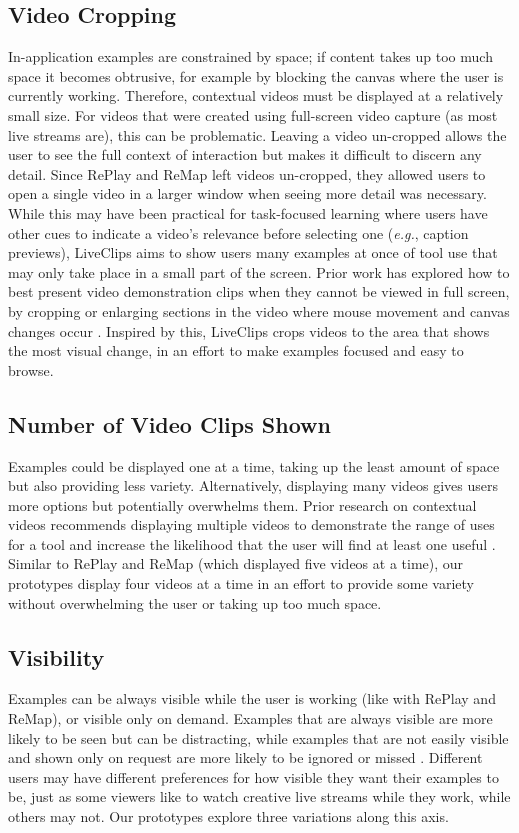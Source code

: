 \subsection{Video Cropping}
In-application examples are constrained by space; if content takes up too much space it becomes obtrusive, for example by blocking the canvas where the user is currently working. Therefore, contextual videos must be displayed at a relatively small size. For videos that were created using full-screen video capture (as most live streams are), this can be problematic. Leaving a video un-cropped allows the user to see the full context of interaction but makes it difficult to discern any detail. Since RePlay and ReMap left videos un-cropped, they allowed users to open a single video in a larger window when seeing more detail was necessary. While this may have been practical for task-focused learning where users have other cues to indicate a video's relevance before selecting one (\textit{e.g.}, caption previews), LiveClips aims to show users many examples at once of tool use that may only take place in a small part of the screen. Prior work has explored how to best present video demonstration clips when they cannot be viewed in full screen, by cropping or enlarging sections in the video where mouse movement and canvas changes occur \cite{Chi2012}. Inspired by this, LiveClips crops videos to the area that shows the most visual change, in an effort to make examples focused and easy to browse.

\subsection{Number of Video Clips Shown}
Examples could be displayed one at a time, taking up the least amount of space but also providing less variety. Alternatively, displaying many videos gives users more options but potentially overwhelms them. Prior research on contextual videos recommends displaying multiple videos to demonstrate the range of uses for a tool and increase the likelihood that the user will find at least one useful \cite{Lafreniere2014, Matejka2011}. Similar to RePlay and ReMap (which displayed five videos at a time), our prototypes display four videos at a time in an effort to provide some variety without overwhelming the user or taking up too much space.

\subsection{Visibility}
Examples can be always visible while the user is working (like with RePlay and ReMap), or visible only on demand. Examples that are always visible are more likely to be seen but can be distracting, while examples that are not easily visible and shown only on request are more likely to be ignored or missed \cite{Rhodes1996}. Different users may have different preferences for how visible they want their examples to be, just as some viewers like to watch creative live streams while they work, while others may not. Our prototypes explore three variations along this axis.


